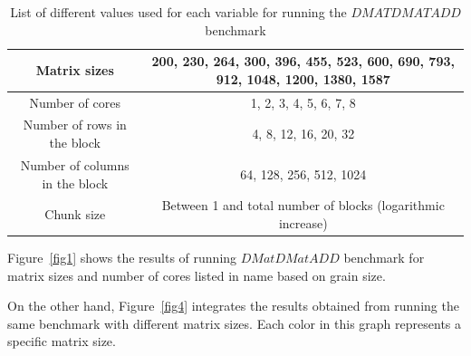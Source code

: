 \vspace{\baselineskip}	
\begin{table}[H]
	\centering
		\resizebox{\textwidth}{!}
		{\begin{tabular}{|c | c |} 
			\hline
			Matrix sizes & 200, 230, 264, 300, 396, 455, 523, 600, 690, 793, 912, 1048, 1200, 1380, 1587 \\ [0.5ex] 
			\hline
			Number of cores & 1, 2, 3, 4, 5, 6, 7, 8 \\ 	
			\hline
			Number of rows in the block & 4, 8, 12, 16, 20, 32 \\
			\hline	
			Number of columns in the block & 64, 128, 256, 512, 1024 \\
			\hline
			Chunk size & Between 1 and total number of blocks (logarithmic increase)\\\hline
		\end{tabular}}

		\caption{List of different values used for each variable for running the $DMATDMATADD$ benchmark}
		\label{table1}
\end{table}




Figure~\ref{fig1} shows the results of running $DMatDMatADD$ benchmark for matrix sizes and number of cores listed in \tablename{name} based on grain size. 

On the other hand, Figure~\ref{fig4} integrates the results obtained from running the same benchmark with different matrix sizes. Each color in this graph represents a specific matrix size. 

